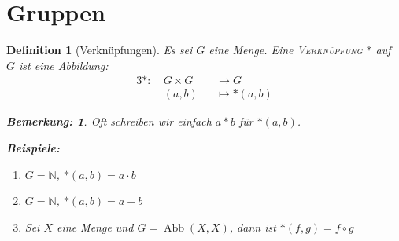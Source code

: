 \documentclass{report}
\newcommand{\N}{\mathbb{N}}
\DeclareMathOperator{\abb}{Abb}
\theoremstyle{customrem}
\newtheorem*{bemerkung}{Bemerkung\textnormal:}
\theoremstyle{customdef}
\newtheorem{definition}{Definition}[chapter]
\theoremstyle{customenv}
\newcommand{\defemph}[1]{\textsc{#1}}
\begin{document}
	\section{Gruppen}
	
	\begin{definition}[Verknüpfungen]
		Es sei \(G\) eine Menge. Eine \defemph{Verknüpfung} \(\ast\) auf \(G\) ist eine Abbildung:
		\begin{alignat*}{3}
			\ast :\ & G \times G	&&\to G\\
					&(a, b) 		&&\mapsto \ast(a, b)
		\end{alignat*}
		
		\begin{bemerkung}
			Oft schreiben wir einfach \(a \ast b\) für \(\ast(a, b)\).\\
		\end{bemerkung}

		\textbf{Beispiele:}
		\begin{enumerate}[leftmargin=2cm]
			\itemsep0cm
			\item \(G = \N\), \( \ast(a, b) = a \cdot b\)
			\item \(G = \N\), \( \ast(a, b) = a + b\)
			\item Sei \(X\) eine Menge und \(G = \abb(X, X)\), dann ist \(\ast(f, g) = f \circ g\)
		\end{enumerate}		
	\end{definition}
	
\end{document}
